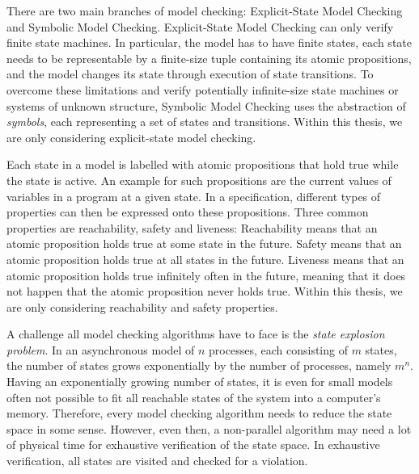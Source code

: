 \documentclass[
fancyheadings, %
%
%
]{stsreprt}
\begin{document}
There are two main branches of model checking:
Explicit-State Model Checking and Symbolic Model Checking.
Explicit-State Model Checking can only verify finite state machines.
In particular, the model has to have finite states, each state needs to be representable by a finite-size tuple containing its atomic propositions, and the model changes its state through execution of state transitions.
To overcome these limitations and verify potentially infinite-size state machines or systems of unknown structure, Symbolic Model Checking uses the abstraction of \emph{symbols}, each representing a set of states and transitions.
Within this thesis, we are only considering explicit-state model checking.

Each state in a model is labelled with atomic propositions that hold true while the state is active.
An example for such propositions are the current values of variables in a program at a given state.
In a specification, different types of properties can then be expressed onto these propositions.
Three common properties are reachability, safety and liveness:
Reachability means that an atomic proposition holds true at some state in the future.
Safety means that an atomic proposition holds true at all states in the future.
Liveness means that an atomic proposition holds true infinitely often in the future, meaning that it does not happen that the atomic proposition never holds true.
Within this thesis, we are only considering reachability and safety properties.

A challenge all model checking algorithms have to face is the \emph{state explosion problem}.
In an asynchronous model of $n$ processes, each consisting of $m$ states, the number of states grows exponentially by the number of processes, namely $m^n$.
Having an exponentially growing number of states, it is even for small models often not possible to fit all reachable states of the system into a computer's memory.
Therefore, every model checking algorithm needs to reduce the state space in some sense.
However, even then, a non-parallel algorithm may need a lot of physical time for exhaustive verification of the state space.
In exhaustive verification, all states are visited and checked for a violation.
\cite{Clarke2018.Introduction-to-Model-Checking,Holzmann2018.Explicit-State-Model-Checking}
\end{document}
